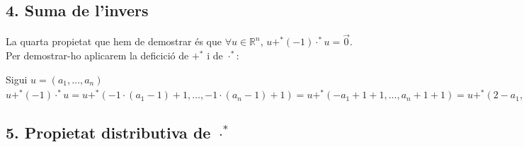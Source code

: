 \documentclass[a4paper, 9pt]{article}
\begin{document}
    \subsection*{4. Suma de l'invers}
        La quarta propietat que hem de demostrar \'es que ${\forall u \in \mathbb{R}^n}$, ${u +^* (-1)\cdot^*u = \vec{0}}$. Per demostrar-ho aplicarem la deficici\'o de ${+^*}$ i de ${\cdot^*}$:
        \begin{center}
            Sigui ${u = (a_1,\dots,a_n)}$ \\
            \begin{math}
                u+^*(-1)\cdot^*u = u +^* (-1\cdot(a_1-1)+1,\dots,-1\cdot(a_n-1)+1) = u +^* (-a_1+1+1,\dots,a_n+1+1) = u +^* (2-a_1,\dots,2-a_n) = (a_1+(2-a_1)-1,\dots,a_n+(2-a_n)-1) = (1,\dots,1) = \vec{0}
            \end{math}
        \end{center}

    \subsection*{5. Propietat distributiva de ${\cdot^*}$}
\end{document}
